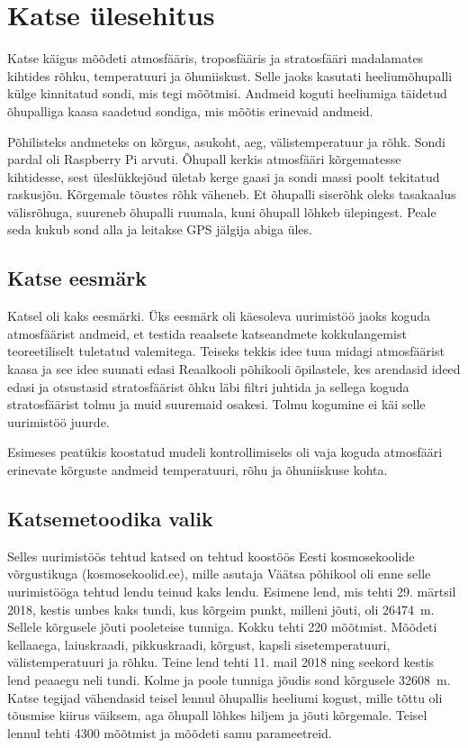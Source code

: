 \documentclass{trkut}%
\begin{document}
\chapter{Katse ülesehitus}
Katse käigus mõõdeti atmosfääris, troposfääris ja stratosfääri madalamates kihtides rõhku, temperatuuri ja õhuniiskust. Selle jaoks kasutati heeliumõhupalli külge kinnitatud sondi, mis tegi mõõtmisi. Andmeid koguti heeliumiga täidetud õhupalliga kaasa saadetud sondiga, mis mõõtis erinevaid andmeid.

Põhilisteks andmeteks on kõrgus, asukoht, aeg, välistemperatuur ja rõhk. Sondi pardal oli Raspberry Pi arvuti. Õhupall kerkis atmosfääri kõrgematesse kihtidesse, sest üleslükkejõud ületab kerge gaasi ja sondi massi poolt tekitatud raskusjõu. Kõrgemale tõustes rõhk väheneb. Et õhupalli siserõhk oleks tasakaalus välisrõhuga, suureneb õhupalli ruumala, kuni õhupall lõhkeb ülepingest. Peale seda kukub sond alla ja leitakse GPS jälgija abiga üles.


\section{Katse eesmärk}
Katsel oli kaks eesmärki. Üks eesmärk oli käesoleva uurimistöö jaoks koguda atmosfäärist andmeid, et testida reaalsete katseandmete kokkulangemist teoreetiliselt tuletatud valemitega. Teiseks tekkis idee tuua midagi atmosfäärist kaasa ja see idee suunati edasi Reaalkooli põhikooli õpilastele, kes arendasid ideed edasi ja otsustasid stratosfäärist õhku läbi filtri juhtida ja sellega koguda stratosfäärist tolmu ja muid suuremaid osakesi. Tolmu kogumine ei käi selle uurimistöö juurde.

Esimeses peatükis koostatud mudeli kontrollimiseks oli vaja koguda atmosfääri erinevate kõrguste andmeid temperatuuri, rõhu ja õhuniiskuse kohta.

\section{Katsemetoodika valik}
Selles uurimistöös tehtud katsed on tehtud koostöös Eesti kosmosekoolide võrgustikuga (kosmosekoolid.ee), mille asutaja Väätsa põhikool oli enne selle uurimistööga tehtud lendu teinud kaks lendu. Esimene lend, mis tehti 29. märtsil 2018, kestis umbes kaks tundi, kus kõrgeim punkt, milleni jõuti, oli \SI{26474}{m}. Sellele kõrgusele jõuti pooleteise tunniga. Kokku tehti 220 mõõtmist. Mõõdeti kellaaega, laiuskraadi, pikkuskraadi, kõrgust, kapsli sisetemperatuuri, välistemperatuuri ja rõhku. Teine lend tehti 11. mail 2018 ning seekord kestis lend peaaegu neli tundi. Kolme ja poole tunniga jõudis sond kõrgusele \SI{32608}{m}. Katse tegijad vähendasid teisel lennul õhupallis heeliumi kogust, mille tõttu oli tõusmise kiirus väiksem, aga õhupall lõhkes hiljem ja jõuti kõrgemale. Teisel lennul tehti 4300 mõõtmist ja mõõdeti samu parameetreid.
\end{document}
